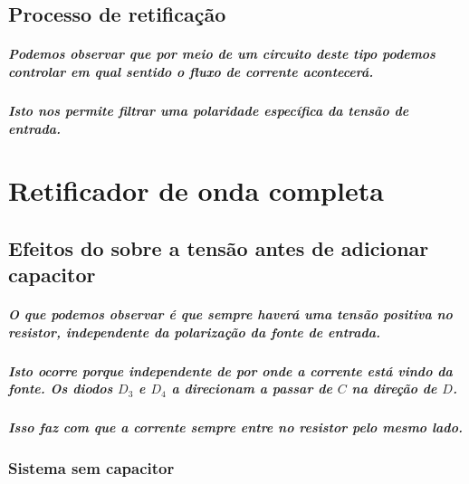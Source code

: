 \documentclass[12pt,twoside, a4paper, twocolumn]{article}
\begin{document}
\subsection{Processo de retificação}
\subparagraph*{Podemos observar que por meio de um circuito deste tipo podemos controlar em qual sentido o fluxo de corrente acontecerá. }

\subparagraph*{Isto nos permite filtrar uma polaridade específica da tensão de entrada.}

\newpage

\section{Retificador de onda completa}

\subsection{Efeitos do sobre a tensão antes de adicionar capacitor}

\subparagraph*{O que podemos observar é que sempre haverá uma tensão positiva no resistor, independente da polarização da fonte de entrada. }

\subparagraph*{Isto ocorre porque independente de por onde a corrente está vindo da fonte. Os diodos $D_3$ e $D_4$ a direcionam a passar de $C$ na direção de $D$.}

\subparagraph*{Isso faz com que a corrente sempre entre no resistor pelo mesmo lado.}

\subsubsection{Sistema sem capacitor}
\end{document}
